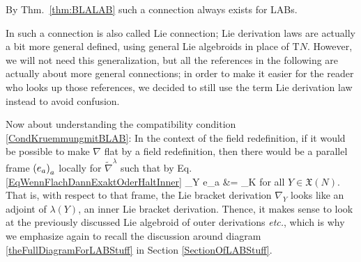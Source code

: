 \begin{remark}
\leavevmode\newline
By Thm.~\ref{thm:BLALAB} such a connection always exists for LABs.

In \cite[\S 5.2, second part of Example 5.2.12; page 188f.]{mackenzieGeneralTheory} such a connection is also called Lie connection; Lie derivation laws are actually a bit more general defined, using general Lie algebroids in place of $\mathrm{T}N$. However, we will not need this generalization, but all the references in the following are actually about more general connections; in order to make it easier for the reader who looks up those references, we decided to still use the term Lie derivation law instead to avoid confusion.
\end{remark}
%
%
%

Now about understanding the compatibility condition \eqref{CondKruemmungmitBLAB}: In the context of the field redefinition, if it would be possible to make $\nabla$ flat by a field redefinition, then there would be a parallel frame $\mleft( e_a \mright)_a$ locally for $\widetilde{\nabla}^\lambda$ such that by Eq. \eqref{EqWennFlachDannExaktOderHaltInner}
\bas
\nabla_Y e_a
&=
_K
\eas
for all $Y \in \mathfrak{X}(N)$. That is, with respect to that frame, the Lie bracket derivation $\nabla_Y$ looks like an adjoint of $\lambda(Y)$, an inner Lie bracket derivation. Thence, it makes sense to look at the previously discussed Lie algebroid of outer derivations \textit{etc.}, which is why we emphasize again to recall the discussion around diagram \eqref{theFullDiagramForLABStuff} in Section \ref{SectionOfLABStuff}.

